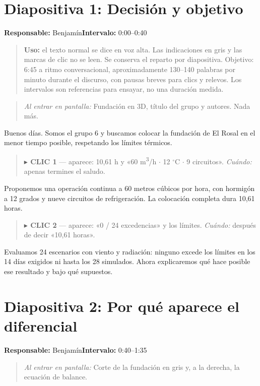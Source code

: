 \documentclass[11pt,a4paper]{article}
\newenvironment{indicacion}{\begin{quote}\small\color{grisindicacion}}{\end{quote}}
\newcommand{\lamina}[4]{%
  \section*{\color{petroleo}Diapositiva #1: #2}%
  \textbf{Responsable:} #3\hfill\textbf{Intervalo:} #4\par
}
\begin{document}
\lamina{1}{Decisión y objetivo}{Benjamín}{0:00--0:40}

\begin{indicacion}\textbf{Uso:} el texto normal se dice en voz alta. Las indicaciones en gris y las marcas de clic no se leen. Se conserva el reparto por diapositiva. Objetivo: 6:45 a ritmo conversacional, aproximadamente 130--140 palabras por minuto durante el discurso, con pausas breves para clics y relevos. Los intervalos son referencias para ensayar, no una duración medida.\end{indicacion}

\begin{indicacion}\emph{Al entrar en pantalla:} Fundación en 3D, título del grupo y autores. Nada más.\end{indicacion}


Buenos días. Somos el grupo 6 y buscamos colocar la fundación de El Rosal en el menor tiempo posible, respetando los límites térmicos.



\begin{indicacion}\textbf{\ensuremath{\blacktriangleright} CLIC 1} --- aparece: 10,61 h y «60 m\textsuperscript{3}/h \ensuremath{\cdot} 12 \ensuremath{^\circ}C \ensuremath{\cdot} 9 circuitos». \emph{Cuándo:} apenas termines el saludo.\end{indicacion}


Proponemos una operación continua a 60 metros cúbicos por hora, con hormigón a 12 grados y nueve circuitos de refrigeración. La colocación completa dura 10,61 horas.



\begin{indicacion}\textbf{\ensuremath{\blacktriangleright} CLIC 2} --- aparece: «0 / 24 excedencias» y los límites. \emph{Cuándo:} después de decir «10,61 horas».\end{indicacion}


Evaluamos 24 escenarios con viento y radiación: ninguno excede los límites en los 14 días exigidos ni hasta los 28 simulados. Ahora explicaremos qué hace posible ese resultado y bajo qué supuestos.



\clearpage

\lamina{2}{Por qué aparece el diferencial}{Benjamín}{0:40--1:35}

\begin{indicacion}\emph{Al entrar en pantalla:} Corte de la fundación en gris y, a la derecha, la ecuación de balance.\end{indicacion}
\end{document}
